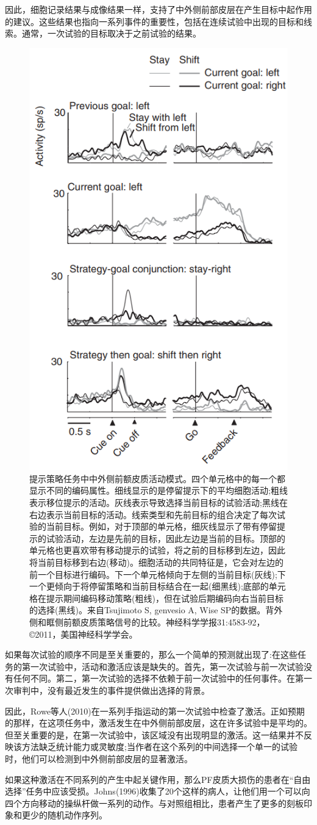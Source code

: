 因此，细胞记录结果与成像结果一样，支持了中外侧前部皮层在产生目标中起作用的建议。这些结果也指向一系列事件的重要性，包括在连续试验中出现的目标和线索。通常，一次试验的目标取决于之前试验的结果。
\begin{figure}
	\centering
	\includegraphics[width=0.3\linewidth]{image_pfc/Fig_6_11}
	\caption{提示策略任务中中外侧前额皮质活动模式。四个单元格中的每一个都显示不同的编码属性。细线显示的是停留提示下的平均细胞活动;粗线表示移位提示的活动。灰线表示导致选择当前目标的试验活动;黑线在右边表示当前目标的活动。线索类型和先前目标的组合决定了每次试验的当前目标。例如，对于顶部的单元格，细灰线显示了带有停留提示的试验活动，左边是先前的目标，因此左边是当前的目标。顶部的单元格也更喜欢带有移动提示的试验，将之前的目标移到左边，因此将当前目标移到右边(移动)。细胞活动的共同特征是，它会对左边的前一个目标进行编码。下一个单元格倾向于左侧的当前目标(灰线);下一个更倾向于将停留策略和当前目标结合在一起(细黑线);底部的单元格在提示期间编码移动策略(粗线)，但在试验后期编码向右当前目标的选择(黑线)。来自Tsujimoto S, genvesio A, Wise SP的数据。背外侧和眶侧前额皮质策略信号的比较。神经科学学报31:4583-92，©2011，美国神经科学学会。}
	\label{fig:fig}
\end{figure}
如果每次试验的顺序不同是至关重要的，那么一个简单的预测就出现了:在这些任务的第一次试验中，活动和激活应该是缺失的。首先，第一次试验与前一次试验没有任何不同。第二，第一次试验的选择不依赖于前一次试验中的任何事件。在第一次审判中，没有最近发生的事件提供做出选择的背景。

因此，Rowe等人(2010)在一系列手指运动的第一次试验中检查了激活。正如预期的那样，在这项任务中，激活发生在中外侧前部皮层，这在许多试验中是平均的。但至关重要的是，在第一次试验中，该区域没有出现明显的激活。这一结果并不反映该方法缺乏统计能力或灵敏度;当作者在这个系列的中间选择一个单一的试验时，他们可以检测到中外侧前部皮层的显著激活。

如果这种激活在不同系列的产生中起关键作用，那么PF皮质大损伤的患者在“自由选择”任务中应该受损。Johns(1996)收集了20个这样的病人，让他们用一个可以向四个方向移动的操纵杆做一系列的动作。与对照组相比，患者产生了更多的刻板印象和更少的随机动作序列。

